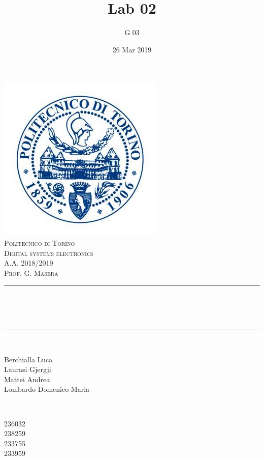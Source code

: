 \documentclass[12pt]{article}
\title{Lab 02}													%
\author{G 03}														%
\date{26 Mar 2019}														%
\makeatletter
\let\thetitle\@title
\let\thedate\@date
\makeatother
\begin{document}

\begin{titlepage}
	\centering
    \vspace*{0.5 cm}
    \includegraphics[scale = 0.75]{polito.jpg}\\[1.0 cm]				%
    \textsc{\LARGE Politecnico di Torino}\\[2.0 cm]						%
	\textsc{\Large Digital systems electronics\\ A.A. 2018/2019}\\[0.5 cm]		%
	\textsc{\Large Prof. G. Masera}\\[0.5 cm]		%
	\rule{\linewidth}{0.2 mm} \\[0.4 cm]
	{ \huge \bfseries \thetitle \\ \small \thedate}\\
	\rule{\linewidth}{0.2 mm} \\[1.5 cm]
	
	\begin{minipage}{0.4\textwidth}
		\begin{flushleft} \large
			Berchialla Luca\\												%
			Laurasi Gjergji
			\\
			
			Mattei Andrea\\
            Lombardo Domenico Maria\\
            
			\end{flushleft}
			\end{minipage}~
			\begin{minipage}{0.4\textwidth}
            
			\begin{flushright} \large
			236032\\													%
			238259\\
            233755\\
            233959\\
            
		\end{flushright}
        
	\end{minipage}\\[2 cm]
	
\end{titlepage}
\end{document}
